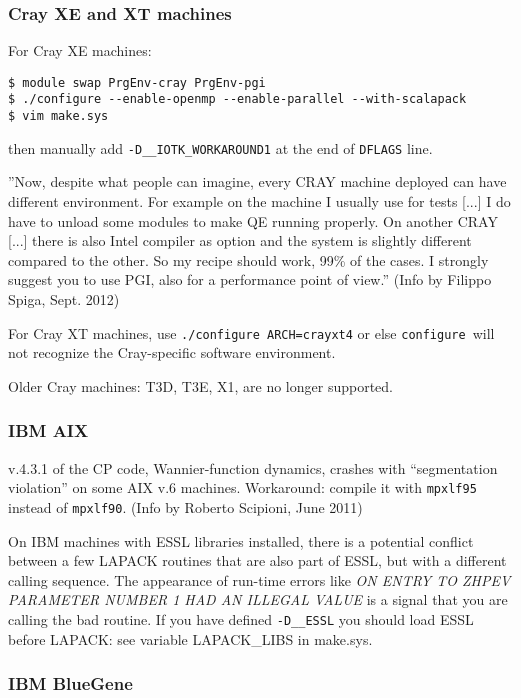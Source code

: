 \documentclass[12pt,a4paper]{article}
\def\configure{\texttt{configure}}
\begin{document}
\subsubsection{Cray XE and XT machines}

For Cray XE machines:
\begin{verbatim}
$ module swap PrgEnv-cray PrgEnv-pgi
$ ./configure --enable-openmp --enable-parallel --with-scalapack
$ vim make.sys
\end{verbatim}
then manually add \texttt{-D\_\_IOTK\_WORKAROUND1} at the end of \texttt{DFLAGS} line.

''Now, despite what people can imagine, every CRAY machine deployed can
have different environment. For example on the machine I usually use 
for tests [...] I do have to unload some modules to make QE running 
properly. On another CRAY [...] there is also Intel compiler as option
and the system is slightly different compared to the other. 
So my recipe should work, 99\% of the cases.
I strongly suggest you to use PGI, also for a performance point of view.''
(Info by Filippo Spiga, Sept. 2012)

For Cray XT machines, use \texttt{./configure ARCH=crayxt4} or else 
\configure\ will not recognize the Cray-specific software environment. 

Older Cray machines: T3D, T3E, X1, are no longer supported.

\subsubsection{IBM AIX}

v.4.3.1 of the CP code, Wannier-function dynamics, crashes with
``segmentation violation'' on some AIX v.6 machines.
Workaround: compile it with \texttt{mpxlf95} instead of 
\texttt{mpxlf90}. (Info by Roberto Scipioni, June 2011)

On IBM machines with ESSL libraries installed, there is a 
potential conflict between a few LAPACK routines that are also part of ESSL, 
but with a different calling sequence. The appearance of run-time errors like {\em
    ON ENTRY TO ZHPEV  PARAMETER NUMBER  1 HAD AN ILLEGAL VALUE}
is a signal that you are calling the bad routine. If you have defined 
\texttt{-D\_\_ESSL} you should load ESSL before LAPACK: see
variable LAPACK\_LIBS in make.sys.

\subsubsection{IBM BlueGene}
\end{document}
